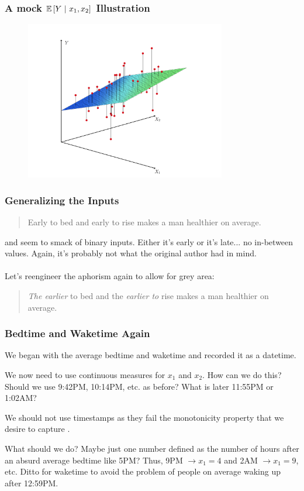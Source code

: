 \documentclass[slides]{beamer} %
\begin{document}
\begin{frame}\frametitle{A mock $\mathbb{E}\left[Y~|~x_1, x_2\right]$ Illustration}

\begin{figure}
\centering
\includegraphics[width=3.45in]{cef.png}
\end{figure}
	
\end{frame}

\begin{frame}\frametitle{Generalizing the Inputs}

\begin{quotation}
Early to bed and early to rise makes a man healthier on average.
\end{quotation}

 and  seem to smack of binary inputs. Either it's early or it's late... no in-between values. Again, it's probably not what the original author had in mind.\\~\\ %

Let's reengineer the aphorism again to allow for grey area:

\begin{quotation}
\emph{The earlier} to bed and the \emph{earlier to} rise makes a man healthier on average.
\end{quotation}

\end{frame}

\begin{frame}\frametitle{Bedtime and Waketime Again}

We began with the average bedtime and waketime and recorded it as a datetime.

We now need to use continuous measures for $x_1$ and $x_2$. How can we do this? Should we use 9:42PM, 10:14PM, etc. as before? What is later 11:55PM or 1:02AM?

We should not use timestamps as they fail the monotonicity property that we desire to capture .

What should we do? Maybe just one number defined as the number of hours after an absurd average bedtime like 5PM? Thus, 9PM $\rightarrow x_1 = 4$ and 2AM $\rightarrow x_1 = 9$, etc. Ditto for waketime to avoid the problem of people on average waking up after 12:59PM.
	
\end{frame}
\end{document}
